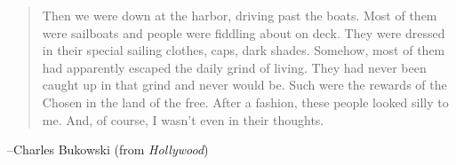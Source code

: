 \documentclass{exam}
\begin{document}
  \else
    \vspace{7 cm}

    \begin{quote}
      \begin{em}
        Then we were down at the harbor, driving past the boats.  Most of them were sailboats and people were fiddling
        about on deck.  They were dressed in their special sailing clothes, caps, dark shades.  Somehow, most of them
        had apparently escaped the daily grind of living.  They had never been caught up in that grind and never would
        be.  Such were the rewards of the Chosen in the land of the free.  After a fashion, these people looked silly to
        me.  And, of course, I wasn't even in their thoughts.
      \end{em}
    \end{quote}
    \hspace{1 cm} --Charles Bukowski (from {\em Hollywood})
  \fi
\end{document}
